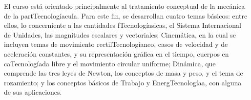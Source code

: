 \begin{syllabus}


\begin{justification}
El curso está orientado principalmente al tratamiento conceptual de la mecánica de la partTecnologíacula. Para este fin, se desarrollan cuatro temas básicos: entre ellos, lo concerniente a las cantidades fTecnologíasicas, el Sistema Internacional de Unidades, las magnitudes escalares y vectoriales; Cinemática, en la cual se incluyen temas de movimiento rectilTecnologíaneo, casos de velocidad y de aceleración constantes, y su representación gráfica en el tiempo, cuerpos en caTecnologíada libre y el movimiento circular uniforme; Dinámica, que comprende las tres leyes de Newton, los conceptos de masa y peso, y el tema de rozamiento; y los conceptos básicos de Trabajo y EnergTecnologíaa, con alguna de sus aplicaciones.
\end{justification}


\end{syllabus}
